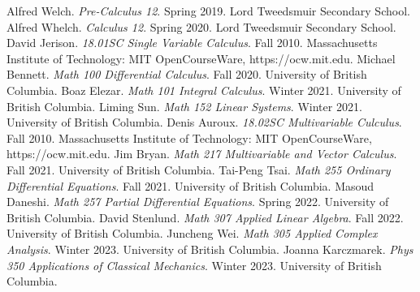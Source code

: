 \begin{thebibliography}{20}
     Alfred Welch. \textit{Pre-Calculus 12}. Spring 2019. Lord Tweedsmuir Secondary School.
     Alfred Whelch. \textit{Calculus 12}. Spring 2020. Lord Tweedsmuir Secondary School.
     David Jerison. \textit{18.01SC Single Variable Calculus}. Fall 2010. Massachusetts Institute of Technology: MIT OpenCourseWare, https://ocw.mit.edu.
     Michael Bennett. \textit{Math 100 Differential Calculus}. Fall 2020. University of British Columbia.
     Boaz Elezar. \textit{Math 101 Integral Calculus}. Winter 2021. University of British Columbia.
     Liming Sun. \textit{Math 152 Linear Systems}. Winter 2021. University of British Columbia.
     Denis Auroux. \textit{18.02SC Multivariable Culculus}. Fall 2010. Massachusetts Institute of Technology: MIT OpenCourseWare, https://ocw.mit.edu.
     Jim Bryan. \textit{Math 217 Multivariable and Vector Calculus}. Fall 2021. University of British Columbia.
     Tai-Peng Tsai. \textit{Math 255 Ordinary Differential Equations}. Fall 2021. University of British Columbia.
     Masoud Daneshi. \textit{Math 257 Partial Differential Equations}. Spring 2022. University of British Columbia.
     David Stenlund. \textit{Math 307 Applied Linear Algebra}. Fall 2022. University of British Columbia.
     Juncheng Wei. \textit{Math 305 Applied Complex Analysis}. Winter 2023. University of British Columbia.
     Joanna Karczmarek. \textit{Phys 350 Applications of Classical Mechanics}. Winter 2023. University of British Columbia.
    \end{thebibliography}